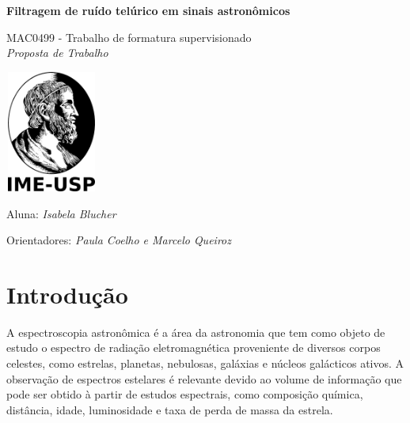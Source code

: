 \documentclass[11pt,twoside,a4paper]{article}
\begin{document}
\begin{center}
  \vspace*{3cm}
  
  \Huge
  \textbf{Filtragem de ruído telúrico em sinais astronômicos}

  \vspace{2.5cm}
  \LARGE
  MAC0499 - Trabalho de formatura supervisionado\\
  \vspace{0.3cm}
  \LARGE
  \textit{Proposta de Trabalho}

  
  \vspace{4.3cm}
  \includegraphics[height=4cm,width=3cm]{ime.png}
  \vspace{2cm}
  
  Aluna: \textit{Isabela Blucher}
  
  
  Orientadores: \textit{Paula Coelho e Marcelo Queiroz}
  
  \vspace{0.8cm}
  
  \Large
  
\end{center}


\newpage
\tableofcontents
\newpage
\section{Introdução}
\doublespacing

A espectroscopia astronômica é a área da astronomia que tem como objeto de estudo o espectro de radiação eletromagnética proveniente de diversos corpos celestes, como estrelas, planetas, nebulosas, galáxias e núcleos galácticos ativos. A observação de espectros estelares é relevante devido ao volume de informação que pode ser obtido à partir de estudos espectrais, como composição química, distância, idade, luminosidade e taxa de perda de massa da estrela\cite{wiki:astro_spectroscopy}.
\end{document}

